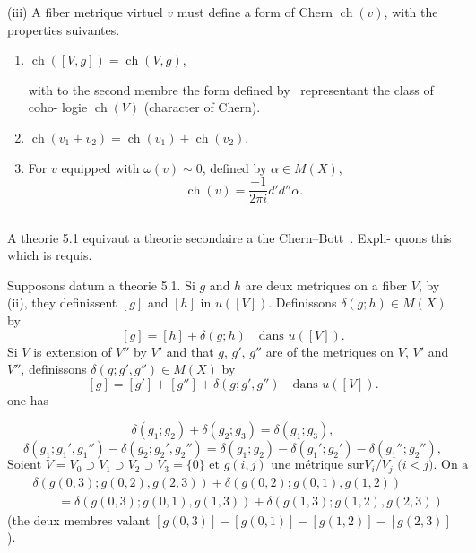 \documentclass[12pt,a4paper]{article}
\theoremstyle{plain}
\theoremstyle{definition}
\DeclareMathOperator{\ch}{ch}
\begin{document}
\medskip

(iii) A fiber metrique virtuel $v$ must define a form of Chern $\ch(v)$,
with the properties suivantes.

\begin{enumerate}[label=(\alph*)]
\item $\ch([V, g]) = \ch(V, g)$,

with to the second membre the form defined by~\cite{4} representant the class of coho-
logie $\ch(V)$ (character of Chern).

\item $\ch(v_1 + v_2) = \ch(v_1) + \ch(v_2)$.

\item For $v$ equipped with $\omega(v) \sim 0$, defined by $\alpha \in M(X)$,
\[
\ch(v) = \frac{-1}{2\pi i} d'd'' \alpha .
\]
\end{enumerate}

\subsection{}

A theorie 5.1 equivaut a theorie secondaire a the Chern--Bott~\cite{4}. Expli-
quons this which is requis.

Supposons datum a theorie 5.1. Si $g$ and $h$ are deux metriques on
a fiber $V$, by (ii), they definissent $[g]$ and $[h]$ in $u([V])$. Definissons
$\delta(g; h) \in M(X)$ by
\begin{equation}\label{eq:5.2.1}
[g] = [h] + \delta(g; h) \quad \text{dans } u([V]) .
\end{equation}
Si $V$ is extension of $V''$ by $V'$ and that $g$, $g'$, $g''$ are of the metriques
on $V$, $V'$ and $V''$, definissons $\delta(g; g', g'') \in M(X)$ by
\begin{equation}\label{eq:5.2.2}
[g] = [g'] + [g''] + \delta(g; g', g'') \quad \text{dans } u([V]) .
\end{equation}
one has

\begin{equation}\label{eq:5.2.3}
\delta(g_1; g_2) + \delta(g_2; g_3) = \delta(g_1; g_3),
\end{equation}
\begin{equation}\label{eq:5.2.4}
\delta(g_1; g_1', g_1'') - \delta(g_2; g_2', g_2'') = \delta(g_1; g_2) - \delta(g_1'; g_2') - \delta(g_1''; g_2''),
\end{equation}
\begin{equation}\label{eq:5.2.5}
\text{Soient } V = V_0 \supset V_1 \supset V_2 \supset V_3 = \{0\} \text{ et } g(i,j) \text{ une m\'etrique sur}
V_i/V_j \text{ ($i < j$). On a}
\end{equation}
\[
\begin{aligned}
&\delta(g(0,3); g(0,2), g(2,3)) + \delta(g(0,2); g(0,1), g(1,2)) \\
&\qquad = \delta(g(0,3); g(0,1), g(1,3)) + \delta(g(1,3); g(1,2), g(2,3))
\end{aligned}
\]
(the deux membres valant $[g(0,3)] - [g(0,1)] - [g(1,2)] - [g(2,3)]$).
\end{document}
